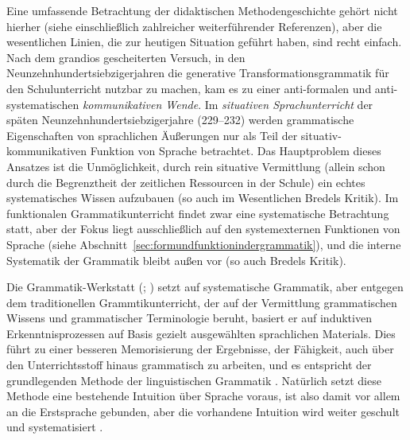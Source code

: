Eine umfassende Betrachtung der didaktischen Methodengeschichte gehört nicht hierher (siehe \citealt[Abschnitt~3.1.]{Bredel2013} einschließlich zahlreicher weiterführender Referenzen), aber die wesentlichen Linien, die zur heutigen Situation geführt haben, sind recht einfach.
Nach dem grandios gescheiterten Versuch, in den Neunzehnhundertsiebzigerjahren die generative Transformationsgrammatik für den Schulunterricht nutzbar zu machen, kam es zu einer anti-formalen und anti-systematischen \textit{kommunikativen Wende}.
Im \textit{situativen Sprachunterricht} der späten Neunzehnhundertsiebzigerjahre (229--232) werden grammatische Eigenschaften von sprachlichen Äußerungen nur als Teil der situativ-kommunikativen Funktion von Sprache betrachtet.
Das Hauptproblem dieses Ansatzes ist die Unmöglichkeit, durch rein situative Vermittlung (allein schon durch die Begrenztheit der zeitlichen Ressourcen in der Schule) ein echtes systematisches Wissen aufzubauen (so auch im Wesentlichen Bredels Kritik).
Im funktionalen Grammatikunterricht findet zwar eine systematische Betrachtung statt, aber der Fokus liegt ausschließlich auf den systemexternen Funktionen von Sprache (siehe Abschnitt~\ref{sec:formundfunktionindergrammatik}), und die interne Systematik der Grammatik bleibt außen vor (so auch Bredels Kritik).

Die Grammatik-Werkstatt (\citealt{EisenbergMenzel1995}; \citealt[Abschnitt~3.2.4]{Bredel2013}) setzt auf systematische Grammatik, aber entgegen dem traditionellen Grammtikunterricht, der auf der Vermittlung grammatischen Wissens und grammatischer Terminologie beruht, basiert er auf induktiven Erkenntnisprozessen auf Basis gezielt ausgewählten sprachlichen Materials.
Dies führt zu einer besseren Memorisierung der Ergebnisse, der Fähigkeit, auch über den Unterrichtsstoff hinaus grammatisch zu arbeiten, und es entspricht der grundlegenden Methode der linguistischen Grammatik \citep[239]{Bredel2013}.
Natürlich setzt diese Methode eine bestehende Intuition über Sprache voraus, ist also damit vor allem an die Erstsprache gebunden, aber die vorhandene Intuition wird weiter geschult und systematisiert \citep[241]{Bredel203}.


